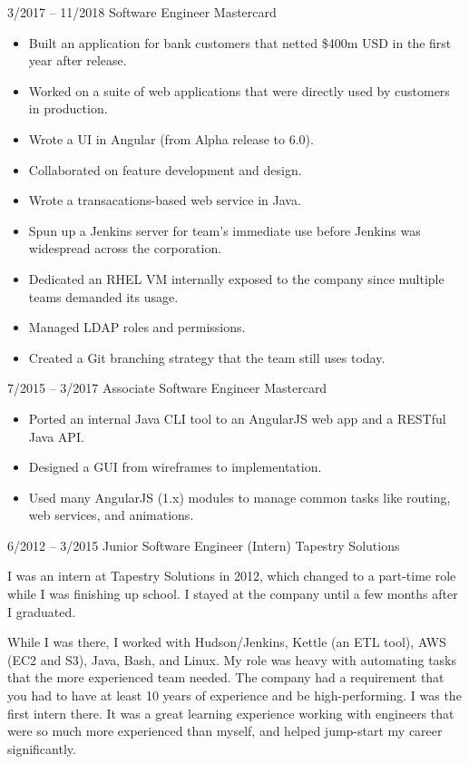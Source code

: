 \documentclass[9pt]{developercv} %
\begin{document}
\begin{entrylist}
{\begin{itemize}[noitemsep,topsep=0pt,parsep=0pt,partopsep=0pt, leftmargin=-1pt]
	\end{itemize}}
	\entry
		{3/2017 -- 11/2018}
		{Software Engineer}
		{Mastercard}
		{\vspace{-10pt}
        \begin{itemize}[noitemsep,topsep=0pt,parsep=0pt,partopsep=0pt, leftmargin=-1pt]
            \item Built an application for bank customers that netted \$400m USD in the first year after release.
            \item Worked on a suite of web applications that were directly used by customers in production.
	    \item Wrote a UI in Angular (from Alpha release to 6.0).
	    \item Collaborated on feature development and design.
	    \item Wrote a transacations-based web service in Java.
	    \item Spun up a Jenkins server for team’s immediate use before Jenkins was widespread across the corporation.
	    \item Dedicated an RHEL VM internally exposed to the company since multiple teams demanded its usage.
	    \item Managed LDAP roles and permissions.
	    \item Created a Git branching strategy that the team still uses today.
	\end{itemize}}
	\entry
		{7/2015 -- 3/2017}
		{Associate Software Engineer}
		{Mastercard}
		{\vspace{-10pt}
        \begin{itemize}[noitemsep,topsep=0pt,parsep=0pt,partopsep=0pt, leftmargin=-1pt]
            \item Ported an internal Java CLI tool to an AngularJS web app and a RESTful Java API.
            \item Designed a GUI from wireframes to implementation.
	    \item Used many AngularJS (1.x) modules to manage common tasks like routing, web services, and animations.
	\end{itemize}}
	\entry
		{6/2012 -- 3/2015}
		{Junior Software Engineer (Intern)}
		{Tapestry Solutions}
		{\vspace{-10pt}
\par I was an intern at Tapestry Solutions in 2012, which changed to a part-time role while I was finishing up
school. I stayed at the company until a few months after I graduated.
\break
\par While I was there, I worked with Hudson/Jenkins, Kettle (an ETL tool), AWS (EC2 and S3), Java, Bash,
and Linux. My role was heavy with automating tasks that the more experienced team needed. The company
had a requirement that you had to have at least 10 years of experience and be high-performing. I was the first
intern there. It was a great learning experience working with engineers that were so much more experienced than
myself, and helped jump-start my career significantly.}
\end{entrylist}
\end{document}
